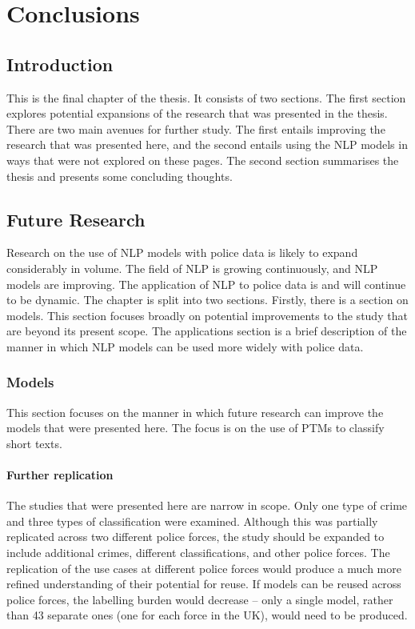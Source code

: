 \chapter{Conclusions}

\section{Introduction} This is the final chapter of the thesis. It consists of two sections. The first section explores potential expansions of the research that was presented in the thesis. There are two main avenues for further study. The first entails improving the research that was presented here, and the second entails using the NLP models in ways that were not explored on these pages. The second section summarises the thesis and presents some concluding thoughts.

\section{Future Research} Research on the use of NLP models with police data is likely to expand considerably in volume. The field of NLP is growing continuously, and NLP models are improving. The application of NLP to police data is and will continue to be dynamic. The chapter is split into two sections. Firstly, there is a section on models. This section focuses broadly on potential improvements to the study that are beyond its present scope. The applications section is a brief description of the manner in which NLP models can be used more widely with police data.

\subsection{Models} This section focuses on the manner in which future research can improve the models that were presented here. The focus is on the use of PTMs to classify short texts.

\subsubsection{Further replication} The studies that were presented here are narrow in scope. Only one type of crime and three types of classification were examined. Although this was partially replicated across two different police forces, the study should be expanded to include additional crimes, different classifications, and other police forces. The replication of the use cases at different police forces would produce a much more refined understanding of their potential for reuse. If models can be reused across police forces, the labelling burden would decrease – only a single model, rather than 43 separate ones (one for each force in the UK), would need to be produced. 

